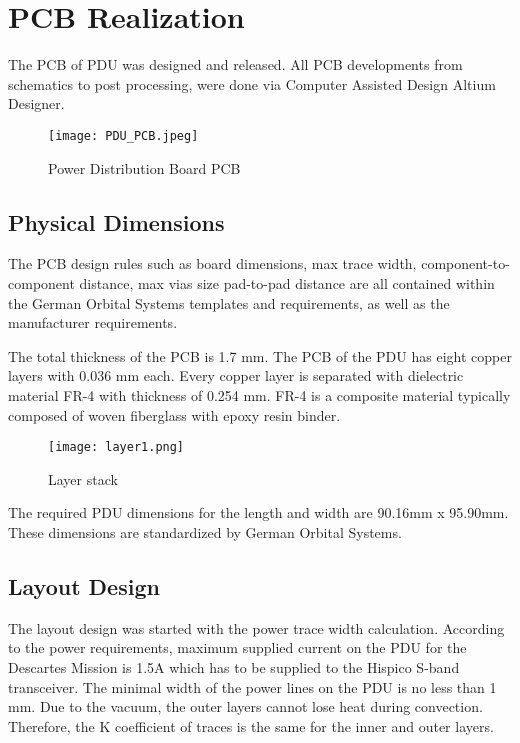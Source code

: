 \chapter{PCB Realization\label{cha:chapter5}}

The PCB of PDU was designed and released. All PCB developments from schematics to post processing, were done via Computer Assisted Design Altium Designer. 

\begin{figure}[h]
	\centering
	\texttt{[image: PDU\_PCB.jpeg]}
	\caption{Power Distribution Board PCB}
	\label{fig: PCB_PDU}
\end{figure} 

\section{Physical Dimensions}

The PCB design rules such as board dimensions, max trace width, component-to-component distance, max vias size pad-to-pad distance are all contained within the German Orbital Systems templates and requirements, as well as the manufacturer requirements. 

The total thickness of the PCB is 1.7 mm. The PCB of the PDU has eight copper layers with 0.036 mm each. Every copper layer is separated with dielectric material FR-4 with thickness of 0.254 mm. FR-4 is a composite material typically composed of woven fiberglass with epoxy resin binder. 


\begin{figure}[h]
	\centering
	\texttt{[image: layer1.png]}
	\caption{Layer stack}
	\label{fig: layerstack}
\end{figure} 


The required PDU dimensions for the length and width are 90.16mm x 95.90mm. These dimensions are standardized by German Orbital Systems.

\section{Layout Design}

The layout design was started with the power trace width calculation.
According to the power requirements, maximum supplied current on the PDU for the Descartes Mission is 1.5A which has to be supplied to the Hispico S-band transceiver. The minimal width of the power lines on the PDU is no less than 1 mm. Due to the vacuum, the outer layers cannot lose heat during convection. Therefore, the K coefficient of traces is the same for the inner and outer layers.

